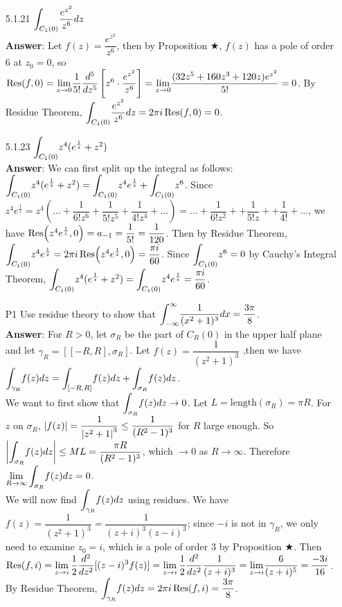 \documentclass{article}
\begin{document}
\begin{itemize}
      \item [5.1.21] $\mathlarger{\int_{C_1(0)}}\dfrac{e^{z^2}}{z^6}dz$\\
            \textbf{Answer}: Let $f(z)=\dfrac{e^{z^2}}{z^6}$, then by Proposition $\bigstar$, $f(z)$ has a pole of order 6 at $z_0=0$, so $\Res(f,0)=\mathlarger{\lim_{z\rightarrow 0}}\dfrac{1}{5!}\dfrac{d^5}{dz^5}\left[z^6\cdot\dfrac{e^{z^2}}{z^6}\right]=\mathlarger{\lim_{z\rightarrow 0}}\dfrac{(32z^5+160z^3+120z)e^{z^2}}{5!}=0$. By Residue Theorem, $\mathlarger{\int_{C_1(0)}}\dfrac{e^{z^2}}{z^6}dz=2\pi i\Res(f,0)=0$.
      \item [5.1.23] $\mathlarger{\int_{C_1(0)}}z^4(e^\frac{1}{z}+z^2)$\\
            \textbf{Answer}: We can first split up the integral as follows: $\mathlarger{\int_{C_1(0)}}z^4(e^\frac{1}{z}+z^2)=\mathlarger{\int_{C_1(0)}}z^4e^\frac{1}{z}+\mathlarger{\int_{C_1(0)}}z^6$. Since $z^4e^{\frac{1}{z}}=z^4(\ldots+\dfrac{1}{6!z^6}+\dfrac{1}{5!z^5}+\dfrac{1}{4!z^4}+\ldots)=\ldots+\dfrac{1}{6!z^2}++\dfrac{1}{5!z}++\dfrac{1}{4!}+\ldots$, we have $\Res(z^4e^{\frac{1}{z}},0)=a_{-1}=\dfrac{1}{5!}=\dfrac{1}{120}$. Then by Residue Theorem, $\mathlarger{\int_{C_1(0)}}z^4e^\frac{1}{z}=2\pi i\Res(z^4e^{\frac{1}{z}},0)=\dfrac{\pi i}{60}$. Since $\mathlarger{\int_{C_1(0)}}z^6=0$ by Cauchy's Integral Theorem, $\mathlarger{\int_{C_1(0)}}z^4(e^\frac{1}{z}+z^2)=\mathlarger{\int_{C_1(0)}}z^4e^\frac{1}{z}=\dfrac{\pi i}{60}$.
      \item [P1] Use residue theory to show that $\mathlarger{\int_{-\infty}^\infty}\dfrac{1}{(x^2+1)^3}dx=\dfrac{3\pi}{8}$.\\
            \textbf{Answer}: For $R>0$, let $\sigma_R$ be the part of $C_R(0)$ in the upper half plane and let $\gamma_R=[[-R,R],\sigma_R]$. Let $f(z)=\dfrac{1}{(z^2+1)^3}$ ,then we have $\mathlarger{\int_{\gamma_R}}f(z)dz=\mathlarger{\int_{[-R,R]}}f(z)dz+\mathlarger{\int_{\sigma_R}}f(z)dz$.\\
            We want to first show that $\mathlarger{\int_{\sigma_R}}f(z)dz\rightarrow 0$. Let $L=\text{length}(\sigma_R)=\pi R$. For $z$ on $\sigma_R$, $\abs{f(z)}=\dfrac{1}{\abs{z^2+1}^3}\leq\dfrac{1}{(R^2-1)^3}$ for $R$ large enough. So $\abs{\mathlarger{\int_{\sigma_R}}f(z)dz}\leq ML=\dfrac{\pi R}{(R^2-1)^3}$, which $\rightarrow 0$ as $R\rightarrow\infty$. Therefore $\mathlarger{\lim_{R\rightarrow\infty}\int_{\sigma_R}}f(z)dz=0$.\\
            We will now find $\mathlarger{\int_{\gamma_R}}f(z)dz$ using residues. We have $f(z)=\dfrac{1}{(z^2+1)^3}=\dfrac{1}{(z+i)^3(z-i)^3}$; since $-i$ is not in $\gamma_R$, we only need to examine $z_0=i$, which is a pole of order 3 by Proposition $\bigstar$. Then $\Res(f,i)=\mathlarger{\lim_{z\rightarrow i}\dfrac{1}{2}\dfrac{d^2}{dz^2}[(z-i)^3f(z)]}=\mathlarger{\lim_{z\rightarrow i}\dfrac{1}{2}\dfrac{d^2}{dz^2}\dfrac{1}{(z+i)^3}}=\mathlarger{\lim_{z\rightarrow i}}\dfrac{6}{(z+i)^5}=\dfrac{-3i}{16}$. By Residue Theorem, $\mathlarger{\int_{\gamma_R}}f(z)dz=2\pi i\Res(f,i)=\dfrac{3\pi}{8}$.\\

\end{itemize}
\end{document}
